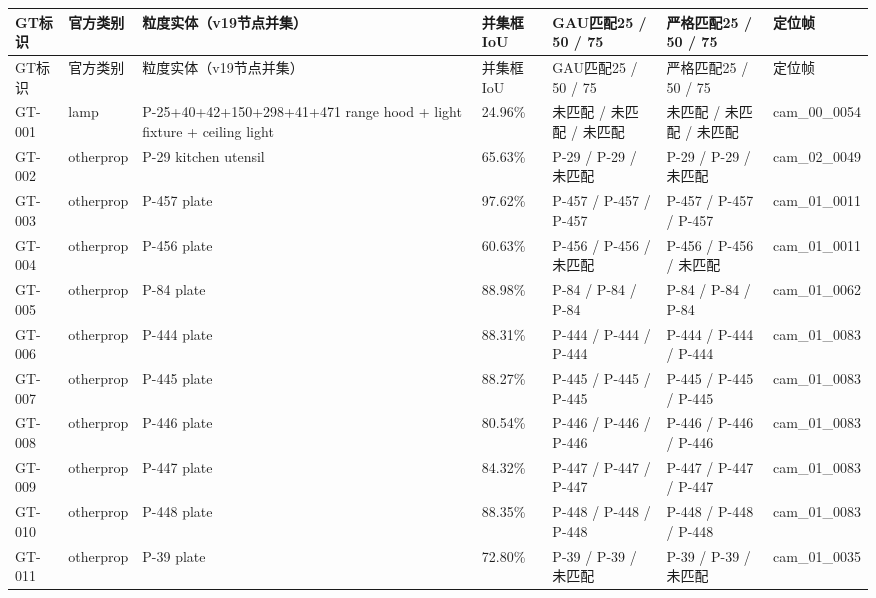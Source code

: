 \documentclass[UTF8,fontset=fandol]{ctexart}
\begin{document}
{\small
\begin{longtable}{|p{}|p{}|p{}|p{}|p{}|p{}|p{}|}
\hline
GT标识 & 官方类别 & 粒度实体（v19节点并集） & 并集框IoU & GAU匹配25 / 50 / 75 & 严格匹配25 / 50 / 75 & 定位帧 \\ \hline
\endfirsthead
\hline
GT标识 & 官方类别 & 粒度实体（v19节点并集） & 并集框IoU & GAU匹配25 / 50 / 75 & 严格匹配25 / 50 / 75 & 定位帧 \\ \hline
\endhead
GT-001 & lamp & P-25+40+42+150+298+41+471 range hood + light fixture + ceiling light & 24.96\% & 未匹配 / 未匹配 / 未匹配 & 未匹配 / 未匹配 / 未匹配 & cam\_00\_0054 \\ \hline
GT-002 & otherprop & P-29 kitchen utensil & 65.63\% & P-29 / P-29 / 未匹配 & P-29 / P-29 / 未匹配 & cam\_02\_0049 \\ \hline
GT-003 & otherprop & P-457 plate & 97.62\% & P-457 / P-457 / P-457 & P-457 / P-457 / P-457 & cam\_01\_0011 \\ \hline
GT-004 & otherprop & P-456 plate & 60.63\% & P-456 / P-456 / 未匹配 & P-456 / P-456 / 未匹配 & cam\_01\_0011 \\ \hline
GT-005 & otherprop & P-84 plate & 88.98\% & P-84 / P-84 / P-84 & P-84 / P-84 / P-84 & cam\_01\_0062 \\ \hline
GT-006 & otherprop & P-444 plate & 88.31\% & P-444 / P-444 / P-444 & P-444 / P-444 / P-444 & cam\_01\_0083 \\ \hline
GT-007 & otherprop & P-445 plate & 88.27\% & P-445 / P-445 / P-445 & P-445 / P-445 / P-445 & cam\_01\_0083 \\ \hline
GT-008 & otherprop & P-446 plate & 80.54\% & P-446 / P-446 / P-446 & P-446 / P-446 / P-446 & cam\_01\_0083 \\ \hline
GT-009 & otherprop & P-447 plate & 84.32\% & P-447 / P-447 / P-447 & P-447 / P-447 / P-447 & cam\_01\_0083 \\ \hline
GT-010 & otherprop & P-448 plate & 88.35\% & P-448 / P-448 / P-448 & P-448 / P-448 / P-448 & cam\_01\_0083 \\ \hline
GT-011 & otherprop & P-39 plate & 72.80\% & P-39 / P-39 / 未匹配 & P-39 / P-39 / 未匹配 & cam\_01\_0035 \\ \hline

\end{longtable}}
\end{document}
